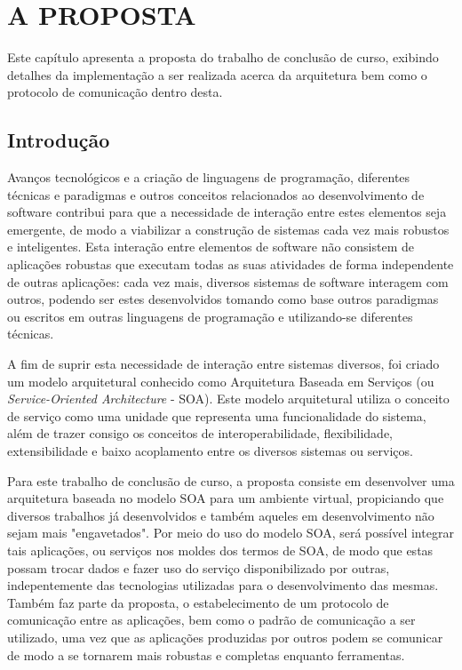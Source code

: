 \chapter[A PROPOSTA]{A PROPOSTA}

Este capítulo apresenta a proposta do trabalho de conclusão de curso, exibindo detalhes da implementação a ser realizada acerca da arquitetura bem como o protocolo de comunicação dentro desta.

\section{Introdução}
Avanços tecnológicos e a criação de linguagens de programação, diferentes técnicas e paradigmas e outros conceitos relacionados ao desenvolvimento de software contribui para que a necessidade de interação entre estes elementos seja emergente, de modo a viabilizar a construção de sistemas cada vez mais robustos e inteligentes. Esta interação entre elementos de software não consistem de aplicações robustas que executam todas as suas atividades de forma independente de outras aplicações: cada vez mais, diversos sistemas de software interagem com outros, podendo ser estes desenvolvidos tomando como base outros paradigmas ou escritos em outras linguagens de programação e utilizando-se diferentes técnicas.

A fim de suprir esta necessidade de interação entre sistemas diversos, foi criado um modelo arquitetural conhecido como Arquitetura Baseada em Serviços (ou \textit{Service-Oriented Architecture} - SOA). Este modelo arquitetural utiliza o conceito de serviço como uma unidade que representa uma funcionalidade do sistema, além de trazer consigo os conceitos de interoperabilidade, flexibilidade, extensibilidade e baixo acoplamento entre os diversos sistemas ou serviços.

Para este trabalho de conclusão de curso, a proposta consiste em desenvolver uma arquitetura baseada no modelo SOA para um ambiente virtual, propiciando que diversos trabalhos já desenvolvidos e também aqueles em desenvolvimento não sejam mais "engavetados". Por meio do uso do modelo SOA, será possível integrar tais aplicações, ou serviços nos moldes dos termos de SOA, de modo que estas possam trocar dados e fazer uso do serviço disponibilizado por outras, indepentemente das tecnologias utilizadas para o desenvolvimento das mesmas. Também faz parte da proposta, o estabelecimento de um protocolo de comunicação entre as aplicações, bem como o padrão de comunicação a ser utilizado, uma vez que as aplicações produzidas por outros podem se comunicar de modo a se tornarem mais robustas e completas enquanto ferramentas.

